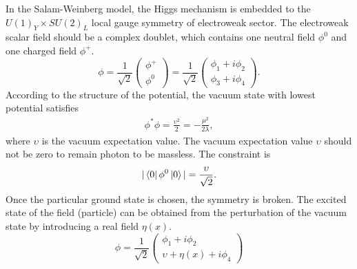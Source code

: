 In the Salam-Weinberg model, the Higgs mechanism is embedded to the $U(1)_{Y}\times SU(2)_{L}$ local gauge symmetry of electroweak sector.
The electroweak scalar field should be a complex doublet, which contains one neutral field $\phi^{0}$ and one charged field $\phi^{+}$.
\begin{equation} \label{eq:EWfield}
  \phi=\frac{1}{\sqrt{2}}
  \begin{pmatrix}
	\phi^{+} \\
	\phi^{0}
  \end{pmatrix}=\frac{1}{\sqrt{2}}
  \begin{pmatrix}
	\phi_{1}+i\phi_{2} \\
	\phi_{3}+i\phi_{4}
  \end{pmatrix}.
\end{equation}
According to the structure of the potential, the vacuum state with lowest potential satisfies
\begin{equation} \label{eq:EWfieldConstraint}
  \begin{aligned}
	\phi^{*}\phi=\frac{\upsilon^{2}}{2}=-\frac{\mu^{2}}{2\lambda},
  \end{aligned}
\end{equation}
where $\upsilon$ is the vacuum expectation value.
The vacuum expectation value $\upsilon$ should not be zero to remain photon to be massless. The constraint is
\begin{equation} \label{eq:EWfieldPhotonConstraint}
  \begin{aligned}
	|\Bra{0}\phi^{0} \Ket{0}|=\frac{\upsilon}{\sqrt{2}}.
  \end{aligned}
\end{equation}
Once the particular ground state is chosen, the symmetry is broken.
The excited state of the field (particle) can be obtained from the perturbation of the vacuum state by introducing a real field $\eta(x)$.
\begin{equation} \label{eq:EWPerField}
  \phi = \frac{1}{\sqrt{2}}
  \begin{pmatrix}
	\phi_{1}+i\phi_{2} \\
	\upsilon+\eta(x)+i\phi_{4}
  \end{pmatrix}
\end{equation}
